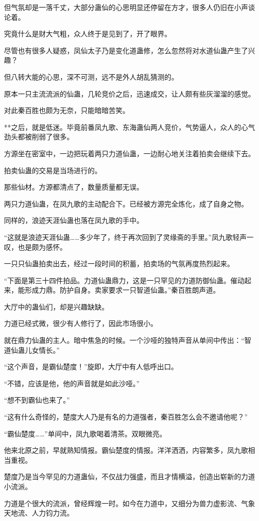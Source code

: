 \begin{this_body}
但气氛却是一落千丈，大部分蛊仙的心思明显还停留在方才，很多人仍旧在小声谈论着。

究竟什么是财大气粗，众人终于是见到了，开了眼界。

尽管也有很多人疑惑，凤仙太子乃是变化道蛊修，怎么忽然将对水道仙蛊产生了兴趣？

但八转大能的心思，深不可测，远不是外人胡乱猜测的。

原本一只主流流派的仙蛊，几轮竞价之后，迅速成交，让人颇有些灰溜溜的感觉。

对此秦百胜也颇为无奈，只能暗暗苦笑。

**之后，就是低迷。毕竟前番凤九歌、东海蛊仙两人竞价，气势逼人，众人的心气劲头都被削弱了很多。

方源坐在密室中，一边把玩着两只力道仙蛊，一边耐心地关注着拍卖会继续下去。

拍卖仙蛊的交易是当场进行的。

那些仙材。方源都清点了，数量质量都无误。

两只力道仙蛊，在凤九歌的主动配合下。已经被方源完全炼化，成了自身之物。

同样的，浪迹天涯仙蛊也落在凤九歌的手中。

“这就是浪迹天涯仙蛊……多少年了，终于再次回到了灵缘斋的手里。”凤九歌轻声一叹，也是颇为感怀。

一只只仙蛊拍卖出去，经过一段时间的积蓄，拍卖场的气氛再度热烈起来。

“下面是第三十四件拍品。力道仙蛊鼎力，这是一只罕见的力道防御仙蛊。催动起来，能形成力鼎。防护自身。卖家要求一只智道仙蛊。”秦百胜朗声道。

大厅中的蛊仙们，却是兴趣缺缺。

力道已经式微，很少有人修行了，因此市场很小。

就在鼎力仙蛊的主人。暗中焦急的时候。一个沙哑的独特声音从单间中传出：“智道仙蛊儿女情长。”

“这个声音，是霸仙楚度！”旋即，大厅中有人低呼出口。

“不错，应该是他，他的声音就是如此沙哑。”

“想不到霸仙也来了。”

“这有什么奇怪的，楚度大人乃是有名的力道强者，秦百胜怎么会不邀请他呢？”

“霸仙楚度……”单间中，凤九歌喝着清茶。双眼微亮。

他来北原之前，早就熟知情报。霸仙楚度的情报。洋洋洒洒，内容繁多，凤九歌相当重视。

楚度乃是当今罕见的力道蛊仙，不仅战力强盛，而且才情横溢，创造出崭新的力道小流派。

力道是个很大的流派，曾经辉煌一时。如今在力道中，又细分为兽力虚影流、气象天地流、人力钧力流。


\end{this_body}
